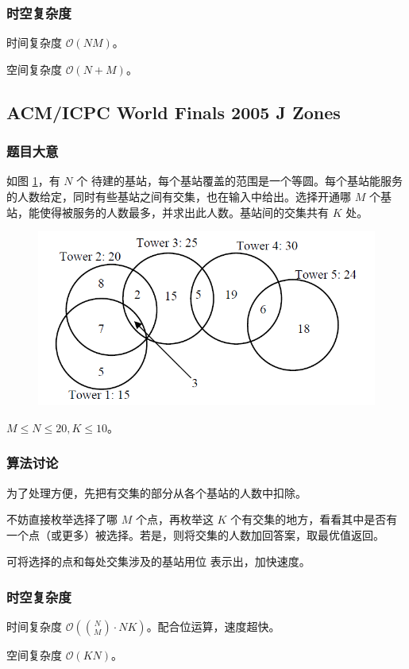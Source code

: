 					\subsubsection{时空复杂度}
						时间复杂度 $\mathcal{O}\left(NM \right)$。
					
						空间复杂度 $\mathcal{O}\left(N + M\right)$。


\newpage
		\subsection{ACM/ICPC World Finals 2005 J Zones}
			\subsubsection{题目大意}

				如图 \ref{2005j}，有
				$N$ 个
				待建的基站，每个基站覆盖的范围是一个等圆。每个基站能服务的人数给定，同时有些基站之间有交集，也在输入中给出。选择开通哪 $M$ 个基站，能使得被服务的人数最多，并求出此人数。基站间的交集共有 $K$ 处。
				
				\begin{figure}[htb]
					\centering
					\includegraphics[width=0.6 \textwidth]{2005j.png}
					\caption{} \label{2005j}
				\end{figure}
				
				$M \le N \le 20,
				 K \le 10$。
			\subsubsection{算法讨论}
				为了处理方便，先把有交集的部分从各个基站的人数中扣除。
				
				不妨直接枚举选择了哪 $M$ 个点，再枚举这 $K$ 个有交集的地方，看看其中是否有一个点（或更多）被选择。若是，则将交集的人数加回答案，取最优值返回。
				
				可将选择的点和每处交集涉及的基站用位
				表示出，加快速度。	
			\subsubsection{时空复杂度}
				时间复杂度 $\mathcal{O}\left(\binom{N}{M} \cdot N K \right)$。配合位运算，速度超快。
					
				空间复杂度 $\mathcal{O}\left(KN\right)$。
\newpage
